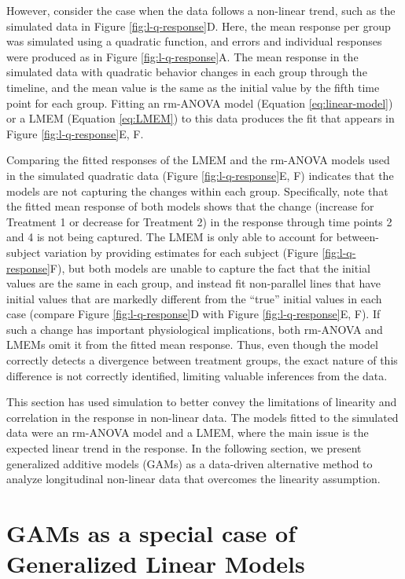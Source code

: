\documentclass[
]{article}
\begin{document}
However, consider the case when the data follows a non-linear trend, such as the simulated data in Figure \ref{fig:l-q-response}D. Here, the mean response per group was simulated using a quadratic function, and errors and individual responses were produced as in Figure \ref{fig:l-q-response}A. The mean response in the simulated data with quadratic behavior changes in each group through the timeline, and the mean value is the same as the initial value by the fifth time point for each group. Fitting an rm-ANOVA model (Equation \eqref{eq:linear-model}) or a LMEM (Equation \eqref{eq:LMEM}) to this data produces the fit that appears in Figure \ref{fig:l-q-response}E, F.

Comparing the fitted responses of the LMEM and the rm-ANOVA models used in the simulated quadratic data (Figure \ref{fig:l-q-response}E, F) indicates that the models are not capturing the changes within each group. Specifically, note that the fitted mean response of both models shows that the change (increase for Treatment 1 or decrease for Treatment 2) in the response through time points 2 and 4 is not being captured. The LMEM is only able to account for between-subject variation by providing estimates for each subject (Figure \ref{fig:l-q-response}F), but both models are unable to capture the fact that the initial values are the same in each group, and instead fit non-parallel lines that have initial values that are markedly different from the ``true'' initial values in each case (compare Figure \ref{fig:l-q-response}D with Figure \ref{fig:l-q-response}E, F). If such a change has important physiological implications, both rm-ANOVA and LMEMs omit it from the fitted mean response. Thus, even though the model correctly detects a divergence between treatment groups, the exact nature of this difference is not correctly identified, limiting valuable inferences from the data.

This section has used simulation to better convey the limitations of linearity and correlation in the response in non-linear data. The models fitted to the simulated data were an rm-ANOVA model and a LMEM, where the main issue is the expected linear trend in the response. In the following section, we present generalized additive models (GAMs) as a data-driven alternative method to analyze longitudinal non-linear data that overcomes the linearity assumption.

\FloatBarrier

\hypertarget{GAM-theory}{%
\section{GAMs as a special case of Generalized Linear Models}\label{GAM-theory}}
\end{document}
